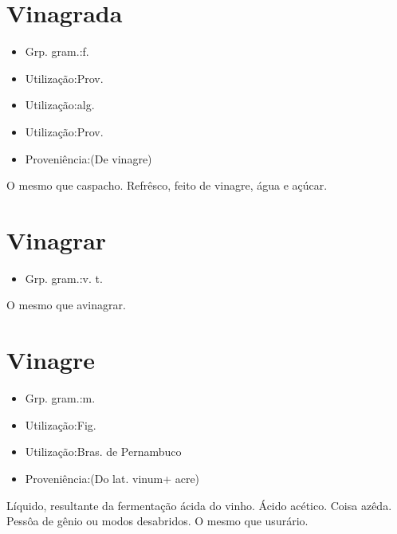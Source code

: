 \documentclass{article}
\begin{document}
\section{Vinagrada}
\begin{itemize}
\item {Grp. gram.:f.}
\end{itemize}
\begin{itemize}
\item {Utilização:Prov.}
\end{itemize}
\begin{itemize}
\item {Utilização:alg.}
\end{itemize}
\begin{itemize}
\item {Utilização:Prov.}
\end{itemize}
\begin{itemize}
\item {Proveniência:(De \textunderscore vinagre\textunderscore )}
\end{itemize}
O mesmo que \textunderscore caspacho\textunderscore .
Refrêsco, feito de vinagre, água e açúcar.
\section{Vinagrar}
\begin{itemize}
\item {Grp. gram.:v. t.}
\end{itemize}
O mesmo que \textunderscore avinagrar\textunderscore .
\section{Vinagre}
\begin{itemize}
\item {Grp. gram.:m.}
\end{itemize}
\begin{itemize}
\item {Utilização:Fig.}
\end{itemize}
\begin{itemize}
\item {Utilização:Bras. de Pernambuco}
\end{itemize}
\begin{itemize}
\item {Proveniência:(Do lat. \textunderscore vinum\textunderscore  + \textunderscore acre\textunderscore )}
\end{itemize}
Líquido, resultante da fermentação ácida do vinho.
Ácido acético.
Coisa azêda.
Pessôa de gênio ou modos desabridos.
O mesmo que \textunderscore usurário\textunderscore .
\end{document}
